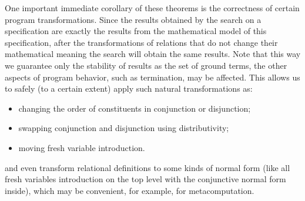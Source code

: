 One important immediate corollary of these theorems is the correctness of certain program transformations. Since the results obtained by the search on a
specification are exactly the results from the mathematical model of this specification, after the transformations of relations that do not change their
mathematical meaning the search will obtain the same results. Note that this way we guarantee only the stability of results as the set of ground terms,
the other aspects of program behavior, such as termination, may be affected. This allows us to safely (to a certain extent) apply such natural
transformations as:

\begin{itemize}
\item changing the order of constituents in conjunction or disjunction;
\item swapping conjunction and disjunction using distributivity;
\item moving fresh variable introduction.
\end{itemize}

and even transform relational definitions to some kinds of normal form (like all fresh variables introduction on the top level with the
conjunctive normal form inside), which may be convenient, for example, for metacomputation.
